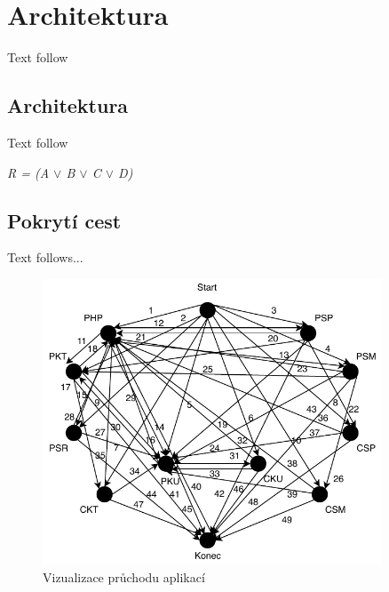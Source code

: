   
  \chapter{Architektura}  
  Text follow
  
  \section{Architektura}
  Text follow

\begin{center}
	\textit{R = (A $\lor$ B $\lor$ C $\lor$ D)}
\end{center}

 
 \section{Pokrytí cest}
Text follows...
 
 \begin{figure}[H]
 	\includegraphics[width=0.9\textwidth]{process_app}
 	\caption{Vizualizace průchodu aplikací}
 \end{figure}
